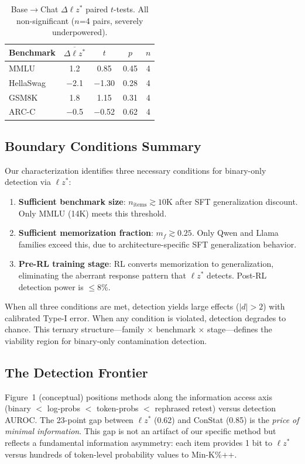 \documentclass[11pt,a4paper]{article}
\newcommand{\lzstar}{\ensuremath{\ell z^*}}
\begin{document}
\begin{table}[t]
\centering
\small
\caption{Base$\to$Chat $\Delta\lzstar$ paired $t$-tests. All non-significant ($n$=4 pairs, severely underpowered).}
\label{tab:natural}
\begin{tabular}{lcccc}
\toprule
\textbf{Benchmark} & $\overline{\Delta\lzstar}$ & $t$ & $p$ & $n$ \\
\midrule
MMLU & 1.2 & 0.85 & 0.45 & 4 \\
HellaSwag & $-$2.1 & $-$1.30 & 0.28 & 4 \\
GSM8K & 1.8 & 1.15 & 0.31 & 4 \\
ARC-C & $-$0.5 & $-$0.52 & 0.62 & 4 \\
\bottomrule
\end{tabular}
\end{table}

\subsection{Boundary Conditions Summary}

Our characterization identifies three necessary conditions for binary-only detection via $\lzstar$:
\begin{enumerate}
\item \textbf{Sufficient benchmark size}: $n_{\text{items}} \gtrsim 10\text{K}$ after SFT generalization discount. Only MMLU (14K) meets this threshold.
\item \textbf{Sufficient memorization fraction}: $m_f \gtrsim 0.25$. Only Qwen and Llama families exceed this, due to architecture-specific SFT generalization behavior.
\item \textbf{Pre-RL training stage}: RL converts memorization to generalization, eliminating the aberrant response pattern that $\lzstar$ detects. Post-RL detection power is $\leq$8\%.
\end{enumerate}

When all three conditions are met, detection yields large effects ($|d| > 2$) with calibrated Type-I error.
When any condition is violated, detection degrades to chance.
This ternary structure---family $\times$ benchmark $\times$ stage---defines the viability region for binary-only contamination detection.

\subsection{The Detection Frontier}

Figure~1 (conceptual) positions methods along the information access axis (binary $<$ log-probs $<$ token-probs $<$ rephrased retest) versus detection AUROC.
The 23-point gap between $\lzstar$ (0.62) and ConStat (0.85) is the \emph{price of minimal information}.
This gap is not an artifact of our specific method but reflects a fundamental information asymmetry: each item provides 1 bit to $\lzstar$ versus hundreds of token-level probability values to Min-K\%++.
\end{document}
